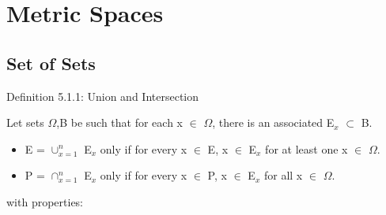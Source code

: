 \newpage
\section[Day 5: Metric Spaces and Set Types]{Metric Spaces}

\subsection{ Set of Sets } 

{ \color{blue} Definition 5.1.1: Union and Intersection } 

	\begin{adjustbox}{minipage=14cm, right, vspace=0.1cm 0cm}
		Let sets $\Omega$,B be such that for each x $\in$ $\Omega$,
		there is an associated E$_x$ $\subset$ B.
		\begin{itemize}[leftmargin=1cm, itemsep=0.4em]
			\item E = $\cup_{x=1}^{n}$ E$_x$ only if for every x $\in$ E, x $\in$ E$_x$ for
				at least one x $\in$ $\Omega$.

			\item P = $\cap_{x=1}^{n}$ E$_x$ only if for every x $\in$ P, x $\in$ E$_x$ for
				all x $\in$ $\Omega$.
		\end{itemize}
		with properties:
	\end{adjustbox}

